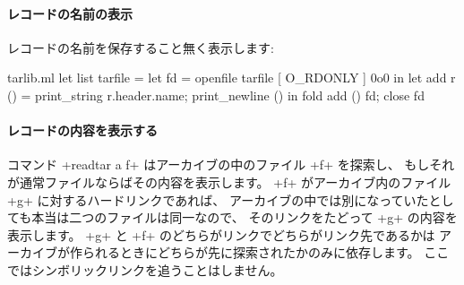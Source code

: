 \paragraph{レコードの名前の表示}
レコードの名前を保存すること無く表示します:
\begin{listingcodefile}{tarlib.ml}
let list tarfile =
  let fd = openfile tarfile [ O_RDONLY ] 0o0 in
  let add r () = print_string r.header.name; print_newline () in
  fold add () fd;
  close fd
\end{listingcodefile}

\paragraph{レコードの内容を表示する}
コマンド \ml+readtar a f+ はアーカイブの中のファイル \ml+f+ を探索し、
もしそれが通常ファイルならばその内容を表示します。
\ml+f+ がアーカイブ内のファイル \ml+g+ に対するハードリンクであれば、
アーカイブの中では別になっていたとしても本当は二つのファイルは同一なので、
そのリンクをたどって \ml+g+ の内容を表示します。
\ml+g+ と \ml+f+ のどちらがリンクでどちらがリンク先であるかは
アーカイブが作られるときにどちらが先に探索されたかのみに依存します。
ここではシンボリックリンクを追うことはしません。


